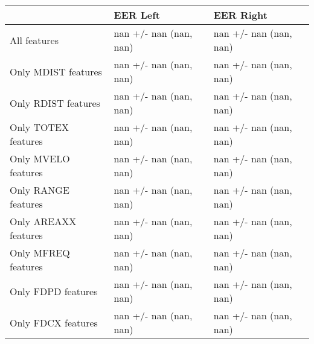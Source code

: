 \begin{tabular}{lll}
\toprule
{} &                EER Left &               EER Right \\
\midrule
All features         &  nan +/- nan (nan, nan) &  nan +/- nan (nan, nan) \\
Only MDIST features  &  nan +/- nan (nan, nan) &  nan +/- nan (nan, nan) \\
Only RDIST features  &  nan +/- nan (nan, nan) &  nan +/- nan (nan, nan) \\
Only TOTEX features  &  nan +/- nan (nan, nan) &  nan +/- nan (nan, nan) \\
Only MVELO features  &  nan +/- nan (nan, nan) &  nan +/- nan (nan, nan) \\
Only RANGE features  &  nan +/- nan (nan, nan) &  nan +/- nan (nan, nan) \\
Only AREAXX features &  nan +/- nan (nan, nan) &  nan +/- nan (nan, nan) \\
Only MFREQ features  &  nan +/- nan (nan, nan) &  nan +/- nan (nan, nan) \\
Only FDPD features   &  nan +/- nan (nan, nan) &  nan +/- nan (nan, nan) \\
Only FDCX features   &  nan +/- nan (nan, nan) &  nan +/- nan (nan, nan) \\
\bottomrule
\end{tabular}
